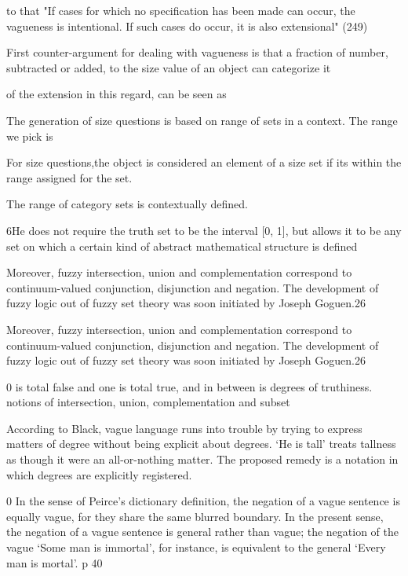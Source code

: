 to  that "If cases for which no specification has been made can occur, the vagueness is intentional. If such cases do occur, it is also extensional" (249)



First counter-argument for dealing with vagueness is that a fraction of number, subtracted or added, to the size value of an object can categorize it 

of the extension in this regard, can be seen as 





The generation of size questions is based on range of sets in a context. The range we pick is  


For size questions,the object is considered an element of a size set if its within the range assigned for the set. 

The range of category sets is contextually defined. 











6He does not require the truth set to be the interval [0,
1], but allows it to be any set on which a certain kind of abstract
mathematical structure is defined

Moreover,
fuzzy intersection, union and complementation correspond to
continuum-valued conjunction, disjunction and negation. The
development of fuzzy logic out of fuzzy set theory was soon initiated by
Joseph Goguen.26

Moreover,
fuzzy intersection, union and complementation correspond to
continuum-valued conjunction, disjunction and negation. The
development of fuzzy logic out of fuzzy set theory was soon initiated by
Joseph Goguen.26

0 is total false and one is total true, and in between is degrees of truthiness. notions of intersection, union,
complementation and subset


According to Black, vague language runs into trouble by trying to
express matters of degree without being explicit about degrees. ‘He is tall’
treats tallness as though it were an all-or-nothing matter. The proposed
remedy is a notation in which degrees are explicitly registered.


0 In the sense of
Peirce’s dictionary definition, the negation of a vague sentence is equally
vague, for they share the same blurred boundary. In the present sense, the
negation of a vague sentence is general rather than vague; the negation of
the vague ‘Some man is immortal’, for instance, is equivalent to the general
‘Every man is mortal’. p 40 




